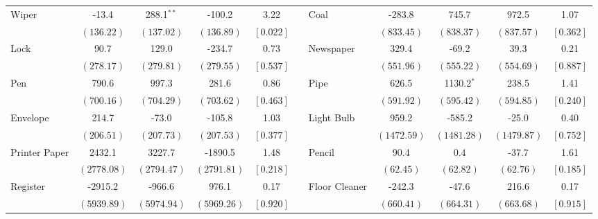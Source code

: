 \begin{tabular}{lccccclcccc}
 \multirow{2}{*}{Wiper}  &  -13.4 &  288.1$^{**}$ & -100.2 &   3.22 & & \multirow{2}{*}{Coal}  & -283.8 &  745.7 &  972.5 &   1.07 \\ 
 & $ \left(136.22\right) $  & $ \left(137.02\right) $  & $ \left(136.89\right) $  & $ \left[ 0.022\right] $  & &  & $ \left(833.45\right) $  & $ \left(838.37\right) $  & $ \left(837.57\right) $  & $ \left[ 0.362\right] $  \\ [0.25em] 
 \multirow{2}{*}{Lock}  &   90.7 &  129.0 & -234.7 &   0.73 & & \multirow{2}{*}{Newspaper}  &  329.4 &  -69.2 &   39.3 &   0.21 \\ 
 & $ \left(278.17\right) $  & $ \left(279.81\right) $  & $ \left(279.55\right) $  & $ \left[ 0.537\right] $  & &  & $ \left(551.96\right) $  & $ \left(555.22\right) $  & $ \left(554.69\right) $  & $ \left[ 0.887\right] $  \\ [0.25em] 
 \multirow{2}{*}{Pen}  &  790.6 &  997.3 &  281.6 &   0.86 & & \multirow{2}{*}{Pipe}  &  626.5 & 1130.2$^{*}$ &  238.5 &   1.41 \\ 
 & $ \left(700.16\right) $  & $ \left(704.29\right) $  & $ \left(703.62\right) $  & $ \left[ 0.463\right] $  & &  & $ \left(591.92\right) $  & $ \left(595.42\right) $  & $ \left(594.85\right) $  & $ \left[ 0.240\right] $  \\ [0.25em] 
 \multirow{2}{*}{Envelope}  &  214.7 &  -73.0 & -105.8 &   1.03 & & \multirow{2}{*}{Light Bulb}  &  959.2 & -585.2 &  -25.0 &   0.40 \\ 
 & $ \left(206.51\right) $  & $ \left(207.73\right) $  & $ \left(207.53\right) $  & $ \left[ 0.377\right] $  & &  & $ \left(1472.59\right) $  & $ \left(1481.28\right) $  & $ \left(1479.87\right) $  & $ \left[ 0.752\right] $  \\ [0.25em] 
 \multirow{2}{*}{Printer Paper}  & 2432.1 & 3227.7 & -1890.5 &   1.48 & & \multirow{2}{*}{Pencil}  &   90.4 &    0.4 &  -37.7 &   1.61 \\ 
 & $ \left(2778.08\right) $  & $ \left(2794.47\right) $  & $ \left(2791.81\right) $  & $ \left[ 0.218\right] $  & &  & $ \left( 62.45\right) $  & $ \left( 62.82\right) $  & $ \left( 62.76\right) $  & $ \left[ 0.185\right] $  \\ [0.25em] 
 \multirow{2}{*}{Register}  & -2915.2 & -966.6 &  976.1 &   0.17 & & \multirow{2}{*}{Floor Cleaner}  & -242.3 &  -47.6 &  216.6 &   0.17 \\ 
 & $ \left(5939.89\right) $  & $ \left(5974.94\right) $  & $ \left(5969.26\right) $  & $ \left[ 0.920\right] $  & &  & $ \left(660.41\right) $  & $ \left(664.31\right) $  & $ \left(663.68\right) $  & $ \left[ 0.915\right] $  \\ [0.25em] 

\end{tabular}
